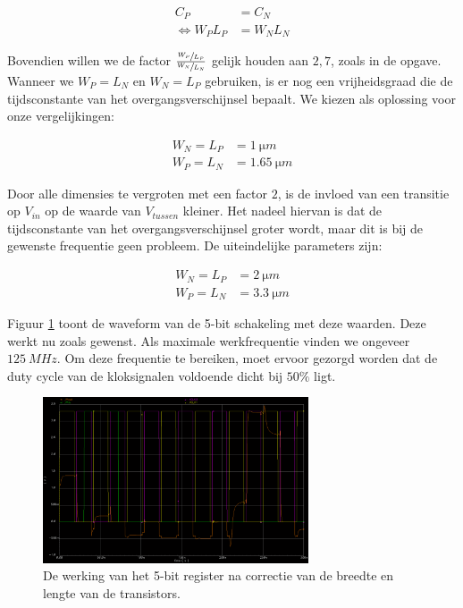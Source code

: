 \documentclass[11pt,a4paper,oneside,dutch]{article}
\begin{document}
\begin{align*}
C_P &= C_N \\
\Leftrightarrow W_P L_P &= W_N L_N
\end{align*}

Bovendien willen we de factor $\frac{\sfrac{W_P}{L_P}}{\sfrac{W_N}{L_N}}$ gelijk houden aan $2,7$, zoals in de opgave. Wanneer we $W_P = L_N$ en $W_N = L_P$ gebruiken, is er nog een vrijheidsgraad die de tijdsconstante van het overgangsverschijnsel bepaalt. We kiezen als oplossing voor onze vergelijkingen:

\begin{align*}
W_N = L_P &= \SI{1}{\micro m} \\
W_P = L_N &= \SI{1,65}{\micro m}
\end{align*}

Door alle dimensies te vergroten met een factor $2$, is de invloed van een transitie op $V_{in}$ op de waarde van $V_{tussen}$ kleiner. Het nadeel hiervan is dat de tijdsconstante van het overgangsverschijnsel groter wordt, maar dit is bij de gewenste frequentie geen probleem. De uiteindelijke parameters zijn:

\begin{align*}
W_N = L_P &= \SI{2}{\micro m} \\
W_P = L_N &= \SI{3,3}{\micro m}
\end{align*}

Figuur \ref{fig:wave_optimaal} toont de waveform van de 5-bit schakeling met deze waarden. Deze werkt nu zoals gewenst. Als maximale werkfrequentie vinden we ongeveer $\SI{125}{MHz}$. Om deze frequentie te bereiken, moet ervoor gezorgd worden dat de duty cycle van de kloksignalen voldoende dicht bij $50\%$ ligt.

\begin{figure}[htp]
	\centering
	\includegraphics[width=0.7\textwidth]{wave_optimaal.png}
	\caption{De werking van het 5-bit register na correctie van de breedte en lengte van de transistors.}
	\label{fig:wave_optimaal}
\end{figure}
\end{document}
